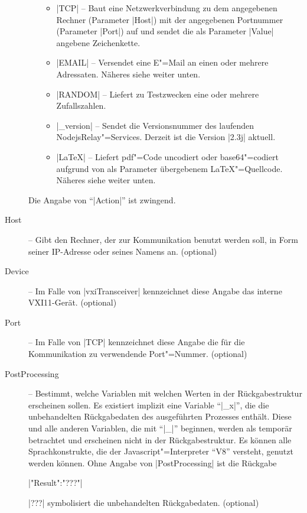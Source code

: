 \documentclass[%
fontsize=11pt
,paper=a4
,twoside
,headings=normal
,pagesize
]{scrartcl}
\begin{document}
\begin{description}
\begin{itemize}
\begin{itemize}
    \item |TCP| -- Baut eine Netzwerkverbindung zu dem angegebenen
    Rechner (Parameter |Host|) mit der angegebenen Portnummer
    (Parameter |Port|) auf und sendet die als Parameter |Value|
    angebene Zeichenkette.

    \item |EMAIL| -- Versendet eine E"=Mail an einen oder mehrere
    Adressaten. Näheres siehe weiter unten.
    
    \item |RANDOM| -- Liefert zu Testzwecken eine oder mehrere
    Zufallszahlen.

    \item |_version| -- Sendet die Versionsnummer des laufenden
    NodejsRelay"=Services. Derzeit ist die Version |2.3j| aktuell.

    \item |LaTeX| -- Liefert pdf"=Code uncodiert oder
    base64"=codiert aufgrund von als Parameter übergebenem
    \LaTeX"=Quellcode. Näheres siehe weiter unten.
    
    \end{itemize}
    
  \end{itemize}

  Die Angabe von "`|Action|"' ist zwingend.

  \item[Host] -- Gibt den Rechner, der zur Kommunikation benutzt werden
  soll, in Form seiner IP-Adresse oder seines Namens an. (optional)

  \item[Device] -- Im Falle von |vxiTransceiver| kennzeichnet diese
  Angabe das interne VXI11-Gerät. (optional)

  \item[Port] -- Im Falle von |TCP| kennzeichnet diese
  Angabe die für die Kommunikation zu verwendende Port"=Nummer. (optional)

  \item[PostProcessing] -- Bestimmt, welche Variablen mit welchen
  Werten in der Rückgabestruktur erscheinen sollen. Es existiert
  implizit eine Variable "`|_x|"', die die unbehandelten
  Rückgabedaten des ausgeführten Prozesses enthält. Diese und alle
  anderen Variablen, die mit "`|_|"' beginnen, werden als temporär
  betrachtet und erscheinen nicht in der Rückgabestruktur. Es können
  alle Sprachkonstrukte, die
  der Javascript"=Interpreter "`V8"' versteht, genutzt werden können.
  Ohne Angabe von |PostProcessing| ist die Rückgabe \par\medskip
  \quad |{"Result":"???"}| \par\medskip
  |???| symbolisiert die unbehandelten Rückgabedaten. (optional)


\end{description}
\end{document}
